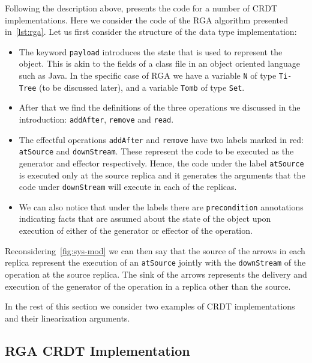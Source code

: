 Following the description above, \citet{ShapiroPBZ11} presents the code
for a number of CRDT implementations.
%
Here we consider the code of the RGA algorithm presented
in~\autoref{lst:rga}.
%
Let us first consider the structure of the data type implementation:
\begin{itemize}
\item The keyword \lstinline|payload| introduces the state that is
  used to represent the object. This is akin to the fields of a class
  file in an object oriented language such as Java. In the specific
  case of RGA we have a variable \lstinline|N| of type
  \lstinline|Ti-Tree| (to be discussed later), and a variable
  \lstinline|Tomb| of type \lstinline|Set|.
\item After that we find the definitions of the three operations we
  discussed in the introduction: \lstinline|addAfter|,
  \lstinline|remove| and \lstinline|read|.
\item The effectful operations \lstinline|addAfter| and
  \lstinline|remove| have two labels marked in red:
  \lstinline|atSource| and \lstinline|downStream|.
  These represent the code to be executed as the generator and
  effector respectively. Hence, the code under the label
  \lstinline|atSource| is executed only at the source replica and it
  generates the arguments that the code under \lstinline|downStream|
  will execute in each of the replicas.
\item We can also notice that under the labels there are
  \lstinline|precondition| annotations indicating facts that are
  assumed about the state of the object upon execution of either of
  the generator or effector of the operation.
\end{itemize}
Reconsidering~\autoref{fig:sys-mod} we can then say that the
source of the arrows in each replica represent the execution of an
\lstinline|atSource| jointly with the \lstinline|downStream| of the
operation at the source replica.
%
The sink of the arrows represents the delivery and execution of the
generator of the operation in a replica other than the source.


In the rest of this section we consider two examples of CRDT
implementations and their linearization arguments.

\subsection{RGA CRDT Implementation}
\label{sec:rga-crdt-impl}

